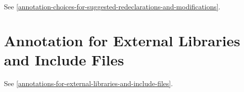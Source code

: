 See \cref{annotation-choices-for-suggested-redeclarations-and-modifications}.

\section{Annotation for External Libraries and Include Files}\label{annotation-for-external-libraries-and-include-files}
See \cref{annotations-for-external-libraries-and-include-files}.
